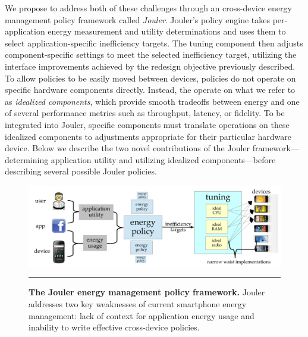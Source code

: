 We propose to address both of these challenges through an cross-device energy
management policy framework called \textit{Jouler}. Jouler's policy engine
takes per-application energy measurement and utility determinations and uses
them to select application-specific inefficiency targets. The tuning
component then adjusts component-specific settings to meet the selected
inefficiency target, utilizing the interface improvements achieved by the
redesign objective previously described. To allow policies to be easily moved
between devices, policies do not operate on specific hardware components
directly. Instead, the operate on what we refer to as \textit{idealized
components}, which provide smooth tradeoffs between energy and one of several
performance metrics such as throughput, latency, or fidelity. To be
integrated into Jouler, specific components must translate operations on
these idealized components to adjustments appropriate for their particular
hardware device. Below we describe the two novel contributions of the Jouler
framework---determining application utility and utilizing idealized
components---before describing several possible Jouler policies.

\begin{figure}
  
  \includegraphics[width=\textwidth]{./figures/jouler.pdf}

  \caption{\textbf{The Jouler energy management policy framework.} Jouler
  addresses two key weaknesses of current smartphone energy management: lack
  of context for application energy usage and inability to write effective
  cross-device policies.}
  
  \vspace*{0.1in}
  \hrule
  \vspace*{-0.1in}
  \label{figure-jouler}

\end{figure}
